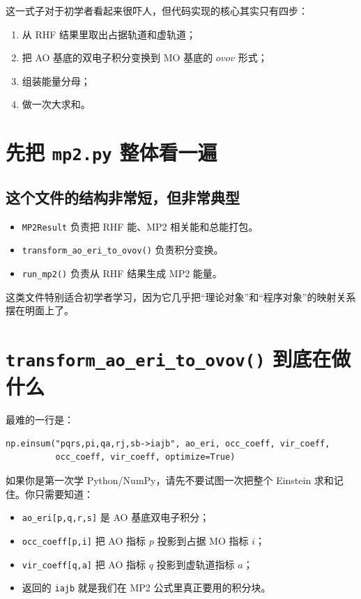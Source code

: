 \documentclass[UTF8,11pt,fontset=fandol]{ctexbook}
\begin{document}
这一式子对于初学者看起来很吓人，但代码实现的核心其实只有四步：
\begin{enumerate}[label=\arabic*.]
  \item 从 RHF 结果里取出占据轨道和虚轨道；
  \item 把 AO 基底的双电子积分变换到 MO 基底的 \(ovov\) 形式；
  \item 组装能量分母；
  \item 做一次大求和。
\end{enumerate}

\section{先把 \texttt{mp2.py} 整体看一遍}



\subsection*{这个文件的结构非常短，但非常典型}

\begin{itemize}
  \item \texttt{MP2Result} 负责把 RHF 能、MP2 相关能和总能打包。
  \item \texttt{transform\_ao\_eri\_to\_ovov()} 负责积分变换。
  \item \texttt{run\_mp2()} 负责从 RHF 结果生成 MP2 能量。
\end{itemize}

这类文件特别适合初学者学习，因为它几乎把“理论对象”和“程序对象”的映射关系摆在明面上了。

\section{\texttt{transform\_ao\_eri\_to\_ovov()} 到底在做什么}

最难的一行是：
\begin{lstlisting}[style=pythonstyle]
np.einsum("pqrs,pi,qa,rj,sb->iajb", ao_eri, occ_coeff, vir_coeff,
          occ_coeff, vir_coeff, optimize=True)
\end{lstlisting}

如果你是第一次学 Python/NumPy，请先不要试图一次把整个 Einstein 求和记住。你只需要知道：
\begin{itemize}
  \item \texttt{ao\_eri[p,q,r,s]} 是 AO 基底双电子积分；
  \item \texttt{occ\_coeff[p,i]} 把 AO 指标 \(p\) 投影到占据 MO 指标 \(i\)；
  \item \texttt{vir\_coeff[q,a]} 把 AO 指标 \(q\) 投影到虚轨道指标 \(a\)；
  \item 返回的 \texttt{iajb} 就是我们在 MP2 公式里真正要用的积分块。
\end{itemize}
\end{document}
